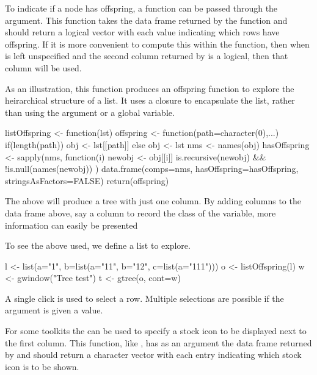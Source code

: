 To indicate if a node has offspring, a function can be passed through
the  argument. This function takes the
data frame returned by the  function and should return
a logical vector with each value indicating which rows have
offspring. If it is more convenient to compute this within the
 function, then when  is left
unspecified and the second column returned by  is a
logical, then that column will be used.

As an illustration, this function produces an offspring function to
explore the heirarchical structure of a list. It uses a closure to
encapsulate the list, rather than using the
 argument or a global variable.
\begin{Schunk}
\begin{Sinput}
 listOffspring <- function(lst) {
   offspring <- function(path=character(0),...) {
     if(length(path))
       obj <- lst[[path]]
     else
       obj <- lst
     nms <- names(obj)
     hasOffspring <- sapply(nms, function(i) {
       newobj <- obj[[i]]
       is.recursive(newobj) && !is.null(names(newobj))
     })
     data.frame(comps=nms, hasOffspring=hasOffspring, 
                stringsAsFactors=FALSE)
   }
   return(offspring)                     
 }
\end{Sinput}
\end{Schunk}
%
The above will produce a tree with just one column. By adding columns
to the data frame above, say a column to record the class of the
variable, more information can easily be presented

To see the above used, we define a list to explore.
\begin{Schunk}
\begin{Sinput}
 l <- list(a="1", b=list(a="11", b="12", c=list(a="111")))
 o <- listOffspring(l)
 w <- gwindow("Tree test")
 t <- gtree(o, cont=w)
\end{Sinput}
\end{Schunk}


A single click is used to select a row. Multiple selections are
possible if the  argument is given a
 value.

For some toolkits the  can be used to
specify a stock icon to be displayed next to the first column. This
function, like , has as an argument the data frame
returned by  and should return a character vector with
each entry indicating which stock icon is to be shown.

